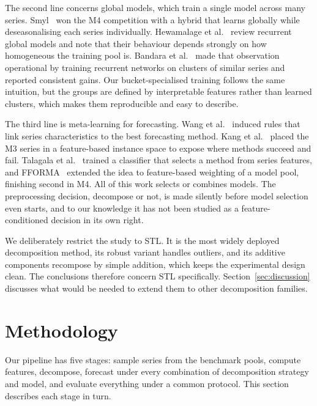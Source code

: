 \documentclass[pdflatex,sn-mathphys-num]{sn-jnl}
\theoremstyle{thmstyleone}
\theoremstyle{thmstyletwo}
\theoremstyle{thmstylethree}
\begin{document}
The second line concerns global models, which train a single model across many
series. Smyl~\cite{smyl2020hybrid} won the M4 competition with a hybrid that
learns globally while deseasonalising each series individually. Hewamalage et
al.~\cite{hewamalage2021rnn} review recurrent global models and note that
their behaviour depends strongly on how homogeneous the training pool is.
Bandara et al.~\cite{bandara2020clustering} made that observation operational
by training recurrent networks on clusters of similar series and reported
consistent gains. Our bucket-specialised training follows the same intuition,
but the groups are defined by interpretable features rather than learned
clusters, which makes them reproducible and easy to describe.

The third line is meta-learning for forecasting. Wang et
al.~\cite{wang2009rules} induced rules that link series characteristics to the
best forecasting method. Kang et al.~\cite{spectral_entropy_ref} placed the M3
series in a feature-based instance space to expose where methods succeed and
fail. Talagala et al.~\cite{talagala2023metalearning} trained a classifier
that selects a method from series features, and
FFORMA~\cite{montero2020fforma} extended the idea to feature-based weighting
of a model pool, finishing second in M4. All of this work selects or combines
models. The preprocessing decision, decompose or not, is made silently before
model selection even starts, and to our knowledge it has not been studied as a
feature-conditioned decision in its own right.

We deliberately restrict the study to STL. It is the most widely deployed
decomposition method, its robust variant handles outliers, and its additive
components recompose by simple addition, which keeps the experimental design
clean. The conclusions therefore concern STL specifically.
Section~\ref{sec:discussion} discusses what would be needed to extend them to
other decomposition families.

\section{Methodology}\label{sec:methodology}

Our pipeline has five stages: sample series from the benchmark pools, compute
features, decompose, forecast under every combination of decomposition
strategy and model, and evaluate everything under a common protocol. This
section describes each stage in turn.
\end{document}
